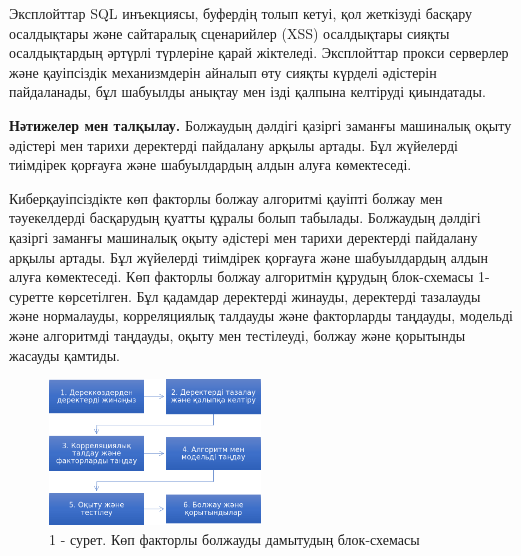 \begin{multicols}{2}
Эксплойттар SQL инъекциясы, буфердің толып кетуі, қол жеткізуді басқару
осалдықтары және сайтаралық сценарийлер (XSS) осалдықтары сияқты
осалдықтардың әртүрлі түрлеріне қарай жіктеледі. Эксплойттар прокси
серверлер және қауіпсіздік механизмдерін айналып өту сияқты күрделі
әдістерін пайдаланады, бұл шабуылды анықтау мен ізді қалпына келтіруді
қиындатады.

{\bfseries Нәтижелер мен талқылау.} Болжаудың дәлдігі қазіргі заманғы
машиналық оқыту әдістері мен тарихи деректерді пайдалану арқылы артады.
Бұл жүйелерді тиімдірек қорғауға және шабуылдардың алдын алуға
көмектеседі.

Киберқауіпсіздікте көп факторлы болжау алгоритмі қауіпті болжау мен
тәуекелдерді басқарудың қуатты құралы болып табылады. Болжаудың дәлдігі
қазіргі заманғы машиналық оқыту әдістері мен тарихи деректерді пайдалану
арқылы артады. Бұл жүйелерді тиімдірек қорғауға және шабуылдардың алдын
алуға көмектеседі. Көп факторлы болжау алгоритмін құрудың блок-схемасы
1-суретте көрсетілген. Бұл қадамдар деректерді жинауды, деректерді
тазалауды және нормалауды, корреляциялық талдауды және факторларды
таңдауды, модельді және алгоритмді таңдауды, оқыту мен тестілеуді,
болжау және қорытынды жасауды қамтиды.
\end{multicols}

\begin{figure}[H]
	\centering
	\includegraphics[width=0.5\textwidth]{media/ict/Graph_2}
	\caption*{1 - сурет. Көп факторлы болжауды дамытудың блок-схемасы}
\end{figure}


